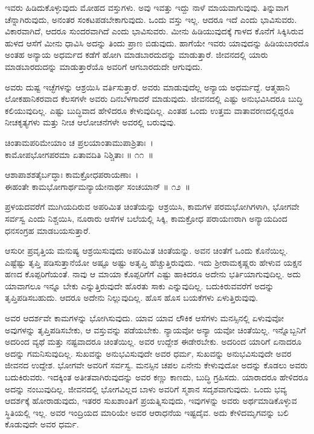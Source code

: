ಇವರು ಹಿಡಿದುಕೊಳ್ಳುವುದು ಮೋಹದ ವಸ್ತುಗಳು. ಅವು ಇವತ್ತು ಇದ್ದು ನಾಳೆ ಮಾಯ\-ವಾಗುವುವು. ತಿನ್ನುವಾಗ ಚೆನ್ನಾಗಿರುವುದು, ಅನಂತರ ಸಂಕಟಪಡಬೇಕಾಗುವುದು. ಒಂದು ವಸ್ತು ಇಲ್ಲ. ಆದರೂ ಇದೆ ಎಂದು ಭಾವಿಸುವರು. ವಿಕಾರವಾಗಿದೆ, ಆದರೂ ಸುಂದರವಾಗಿದೆ ಎಂದು ಭಾವಿಸುವರು. ಮೀನು ಹಿಡಿಯುವುದಕ್ಕೆ ಗಾಳದ ಕೊನೆಗೆ ಸಿಕ್ಕಿಸಿರುವ ಹುಳದ ಆಸೆಗೆ ಮೀನು ಧಾವಿಸಿ ಅದನ್ನು ತಿಂದು ಪ್ರಾಣ ಬಿಡುವುದು. ಹಾಗೆಯೇ ಇವರು ಯಾವು\-ದನ್ನು ಹಿಡಿಯಬಾರದೊ ಅಂತಹ ಅನ್ಯಾಯ ಅಧರ್ಮದ ಕಡೆಗೆ ಹೋಗಿ ಮಾಡಬಾರದುದನ್ನು ಮಾಡುತ್ತಾರೆ. ಜೀವನದಲ್ಲಿ ಯಾರು ಮಾಡಬಾರದುದನ್ನು ಮಾಡುತ್ತಾರೆಯೊ ಅವರಿಗೆ ಆಗಬಾರ\-ದುದೇ ಆಗುವುದು.

\newpage

ಅವರು ದುಷ್ಟ ಇಚ್ಛೆಗಳನ್ನು ಆಶ್ರಯಿಸಿ ವರ್ತಿಸುತ್ತಾರೆ. ಅವರು ಮಾಡುವುದೆಲ್ಲ ಅನ್ಯಾಯ ಅಧರ್ಮದ್ದೆ. ಆತ್ಮಹಾನಿ ಲೋಕಹಾನಿಕರವಾದ ಕೆಲಸಗಳೇ ಅವರು ದಿನಬೆಳಗಾದರೆ ಮಾಡುವುದು. ಜೀವನದಲ್ಲಿ ಎಷ್ಟು ಅನುಭವಿಸಿದರೂ ಬುದ್ಧಿ ಕಲಿಯುವುದಿಲ್ಲ. ಎಷ್ಟು ಬುದ್ಧಿವಾದ ಹೇಳಿದರೂ ಕೇಳುವುದಿಲ್ಲ. ಎಂತಹ ಒಂದು ಉತ್ತಮ ವಾತಾವರಣದಲ್ಲಿದ್ದರೂ ನೀಚಕೃತ್ಯಗಳು ಮತ್ತು ನೀಚ ಆಲೋಚನೆಗಳೇ ಅವರಲ್ಲಿ ಬರುವುವು.

\begin{shloka}
ಚಿಂತಾಮಪರಿಮೇಯಾಂ ಚ ಪ್ರಲಯಾಂತಾಮುಪಾಶ್ರಿತಾಃ~।\\ಕಾಮೋಪಭೋಗಪರಮಾ ಏತಾವದಿತಿ ನಿಶ್ಚಿತಾಃ \hfill॥ ೧೧~॥
\end{shloka}

\begin{shloka}
ಆಶಾಪಾಶಶತೈರ್ಬದ್ಧಾಃ ಕಾಮಕ್ರೋಧಪರಾಯಣಾಃ~।\\ಈಹಂತೇ ಕಾಮಭೋಗಾರ್ಥಮನ್ಯಾಯೇನಾರ್ಥ ಸಂಚಯಾನ್ \hfill॥ ೧೨~॥
\end{shloka}

\begin{artha}
ಪ್ರಳಯದವರೆಗೆ ಮುಗಿಯದಿರುವ ಅಪರಿಮಿತ ಚಿಂತೆಯನ್ನು ಆಶ್ರಯಿಸಿ, ಕಾಮಗಳ ಪರಮಭೋಗಿಗಳಾಗಿ, ಭೋಗವೇ ಸರ್ವಸ್ವ ಎಂದು ನಿಶ್ಚಯಿಸಿ, ನೂರಾರು ಆಸೆಗಳ ಬಲೆಯಲ್ಲಿ ಸಿಕ್ಕಿ, ಕಾಮಕ್ರೋಧ ಪರಾಯಣರಾಗಿ ಅನ್ಯಾಯದಿಂದ ಧನಸಂಗ್ರಹ ಮಾಡಬಯಸುತ್ತಾರೆ.
\end{artha}

ಆಸುರೀ ಪ್ರವೃತ್ತಿಯ ಮನುಷ್ಯ ಆಶ್ರಯಿಸುವುದು ಅಪರಿಮಿತ ಚಿಂತೆಯನ್ನು. ಅವನ ಚಿಂತೆಗೆ ಒಂದು ಕೊನೆಯಿಲ್ಲ. ಎಷ್ಟೆಷ್ಟು ತೃಪ್ತಿ ಪಡಿಸುತ್ತಾನೆಯೋ ಅಷ್ಟೂ ಅಷ್ಟು ಅತೃಪ್ತಿ ಹೆಚ್ಚುತ್ತಿರುವುದು. ಇದು ಶ‍್ರೀರಾಮಕೃಷ್ಣರು ಹೇಳುವ ಯಕ್ಷನ ಹಣದ ಕೊಪ್ಪರಿಗೆಯಂತೆ. ನಾವು ಆ ಮಾಯಾ ಕೊಪ್ಪರಿಗೆಗೆ ಎಷ್ಟು ಹಾಕಿದರೂ ಅದೇನು ಭರ್ತಿಯಾಗುವುದಿಲ್ಲ. ಅದು ಯಾವಾಗಲೂ ಇನ್ನೂ ಬೇಕು ಎನ್ನುತ್ತಿರುವುದೇ ಹೊರತು ಸಾಕು ಎನ್ನುವುದಿಲ್ಲ. ಬದುಕಿರುವವರೆಗೆ ಅದನ್ನು ತೃಪ್ತಿಪಡಿಸಬಹುದು. ಆದರೂ ಅದೇನು ನಿಲ್ಲುವುದಿಲ್ಲ. ಹೊಸ ಹೊಸ ಬಯಕೆಗಳು ಏಳುತ್ತಿರುವುವು.

ಅವರ ಆದರ್ಶವೇ ಕಾಮಗಳನ್ನು ಭೋಗಿಸುವುದು. ಯಾವ ಯಾವ ಲೌಕಿಕ ಆಸೆಗಳು ಮನಸ್ಸಿನಲ್ಲಿ ಏಳುವುವೋ ಅವುಗಳನ್ನು ತೃಪ್ತಿಪಡಿಸಬೇಕು, ಆ ವಸ್ತುವನ್ನು ಪಡೆಯಬೇಕು. ನ್ಯಾಯವೋ ಅನ್ಯಾ ಯವೋ ಚಿಂತೆಯಿಲ್ಲ. ಇನ್ನೊಬ್ಬನಿಗೆ ಅದರಿಂದ ವ್ಯಥೆ ಮತ್ತು ನಷ್ಟವಾದರೂ ಚಿಂತೆಯಿಲ್ಲ. ಅವರ ಉದ್ದೇಶ ಈಡೇರಬೇಕು. ಅದರಿಂದ ಯಾರಿಗೆ ಏನಾದರೂ ಅದನ್ನು ಗಮನಿಸುವುದಿಲ್ಲ. ಸುಖವನ್ನು ಅನುಭವಿಸುವುದೇ ಅವರ ಧರ್ಮ, ಸುಖವನ್ನು ಅನುಭವಿಸುವುದೇ ಅವರ ಜೀವನದ ಉದ್ದೇಶ. ಭೋಗವೇ ಅವರಿಗೆ ಸರ್ವಸ್ವ. ಮನಸ್ಸಿನ ಚಪಲ ಏನೇನು ಕೇಳುವುದೋ ಅದನ್ನು ಕೊಡಲು ಅವರು ಬದುಕಿರುವರು. ಇದಕ್ಕಿಂತ ಅತೀತವಾಗಿರುವುದನ್ನು ಅವರ ಕಣ್ಣು ಕಾಣದು, ಬುದ್ಧಿ ಗ್ರಹಿಸದು. ಯಾರಾದರೂ ಹೇಳಿದರೂ ಅದನ್ನು ನಂಬುವುದಿಲ್ಲ. ಜೀವನದಲ್ಲಿ ಭೋಗ\-ವಿಲ್ಲದ ಬಾಳು ಅವರಿಗೆ ಸ್ಮಶಾನ ಸದೃಶವಾಗುವುದು. ಒಂದು ಭವ್ಯ ಆದರ್ಶಕ್ಕೆ ಹೋರಾಡುವುದು, ಇತರರ ಸುಖಶಾಂತಿಗೆ ಪ್ರಯತ್ನಿಸುವುದು, ಇವುಗಳನ್ನು ಅವರು ಅರ್ಥಮಾಡಿಕೊಳ್ಳುವ ಸ್ಥಿತಿಯಲ್ಲಿ ಇಲ್ಲ. ಅವರ ಇಂದ್ರಿಯದ ಮಾರಿಯೇ ಅವರ ಆರಾಧನೆಯ ಇಷ್ಟದೈವ. ಅದು ಕೇಳಿದ\break ಮೃಗವನ್ನು ಬಲಿ ಕೊಡುವುದೇ ಅವರ ಧರ್ಮ. 

